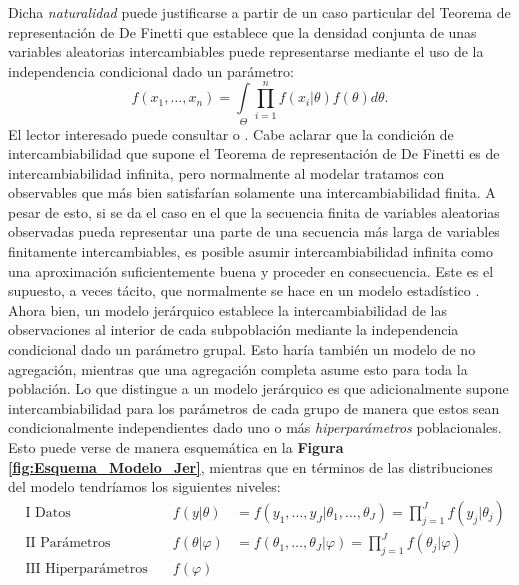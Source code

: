 Dicha \textit{naturalidad} puede justificarse a partir de un caso particular del Teorema de representación de De Finetti que establece que la densidad conjunta de unas variables aleatorias intercambiables puede representarse mediante el uso de la independencia condicional dado un parámetro: 
\begin{equation*}
f(x_1,\dots,x_n) = \int\limits_\Theta \prod\limits_{i=1}^n f(x_i|\theta)f(\theta)d\theta.
\end{equation*} 
El lector interesado puede consultar \textcite{GP98} o \textcite{BernardoSmith00}. Cabe aclarar que la condición de intercambiabilidad que supone el Teorema de representación de De Finetti es de intercambiabilidad infinita, pero normalmente al modelar tratamos con observables que más bien satisfarían solamente una intercambiabilidad finita. A pesar de esto, si se da el caso en el que la secuencia finita de variables aleatorias observadas pueda representar una parte de una secuencia más larga de variables finitamente intercambiables, es posible asumir intercambiabilidad infinita como una aproximación suficientemente buena y proceder en consecuencia\parencite{BernardoSmith00}. Este es el supuesto, a veces tácito, que normalmente se hace en un modelo estadístico \parencite{Gelman13}.\\

Ahora bien, un modelo jerárquico establece la intercambiabilidad de las observaciones al interior de cada subpoblación mediante la independencia condicional dado un parámetro grupal. Esto haría también un modelo de no agregación, mientras que una agregación completa asume esto para toda la población. Lo que distingue a un modelo jerárquico es que adicionalmente supone intercambiabilidad para los parámetros de cada grupo de manera que estos sean condicionalmente independientes dado uno o más \textit{hiperparámetros} poblacionales. Esto puede verse de manera esquemática en la \textbf{Figura \ref{fig:Esquema_Modelo_Jer}}, mientras que en términos de las distribuciones del modelo tendríamos los siguientes niveles: 
\begin{align*}
&\text{I Datos} \quad & f(y|\theta)&=f(y_1,\dots,y_J|\theta_1,\dots,\theta_J)=\prod\limits_{j=1}^Jf(y_j|\theta_j) \\
&\text{II Parámetros} \quad & f(\theta|\varphi)&=f(\theta_1,\dots,\theta_J|\varphi) = \prod\limits_{j=1}^Jf(\theta_j|\varphi)  \\
&\text{III Hiperparámetros} \quad & f(\varphi)&
\end{align*}

